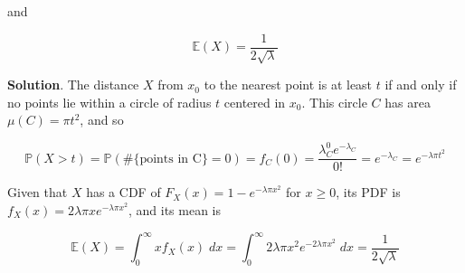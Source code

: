 and

\[ \mathbb{E}(X) = \frac{1}{2 \sqrt{\lambda}} \]

\textbf{Solution}. The distance \(X\) from \(x_{0}\) to the nearest point
is at least \(t\) if and only if no points lie within a circle of radius
\(t\) centered in \(x_{0}\). This circle \(C\) has area
\(\mu(C) = \pi t^{2}\), and so

\[ \mathbb{P}(X > t) = \mathbb{P}(\# \{\text{points in C} \} = 0) = f_C(0) = \frac{\lambda_C^{0} e^{-\lambda_C}}{0!} = e^{-\lambda_C} = e^{-\lambda \pi t^{2}} \]

Given that \(X\) has a CDF of \(F_X(x) = 1 - e^{-\lambda \pi x^{2}}\) for
\(x \geq 0\), its PDF is
\(f_X(x) = 2 \lambda \pi x e^{-\lambda \pi x^{2}}\), and its mean is

\[ \mathbb{E}(X) = \int_{0}^{\infty} x f_X(x) \; dx  = \int_{0}^{\infty} 2 \lambda \pi x^{2} e^{-2 \lambda \pi x^{2}} \; dx = \frac{1}{2 \sqrt{\lambda}}\]
